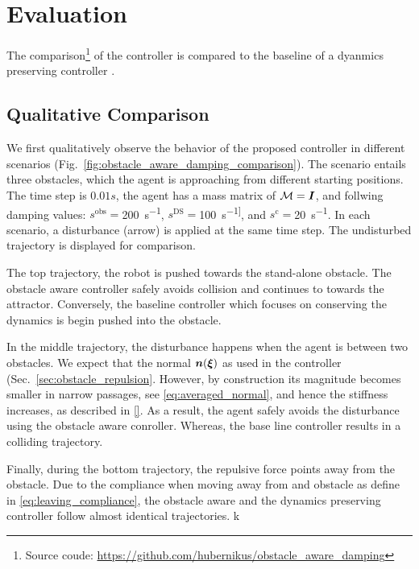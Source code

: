 \section{Evaluation}  \label{sec:evaluation} 

The comparison\footnote{Source coude: \url{https://github.com/hubernikus/obstacle_aware_damping}} of the controller is compared to the baseline of a dyanmics preserving controller \cite{kronander2015passive}.


\subsection{Qualitative Comparison} \label{sec:qual_comp}
We first qualitatively observe the behavior of the proposed controller in different scenarios (Fig.~\ref{fig:obstacle_aware_damping_comparison}). The scenario entails three obstacles, which the agent is approaching from different starting positions. The time step is $0.01 s$, the agent has a mass matrix of $\mathcal{M} = \boldsymbol{I}$, and follwing damping values: 
$s^{\mathrm{obs}}=$\qty{200}{s^{-1}},
$s^{\mathrm{DS}}=$\qty{100}{s^{-1]}}, and
$s^{\mathrm{c}}=$\qty{20}{s^{-1}}.
In each scenario, a disturbance (arrow) is applied at the same time step.
The undisturbed trajectory is displayed for comparison.

The top trajectory, the robot is pushed towards the stand-alone obstacle. The obstacle aware controller safely avoids collision and continues to towards the attractor. Conversely, the baseline controller which focuses on conserving the dynamics is begin pushed into the obstacle. 

In the middle trajectory, the disturbance happens when the agent is between two obstacles. We expect that the normal $\boldsymbol{n}(\boldsymbol{\xi})$ as used in the controller (Sec.~\ref{sec:obstacle_repulsion}.
However, by construction its magnitude becomes smaller in narrow passages, see \eqref{eq:averaged_normal}, and hence the stiffness increases, as described in \eqref{}.
As a result, the agent safely avoids the disturbance using the obstacle aware conroller. Whereas, the base line controller results in a colliding trajectory.

Finally, during the bottom trajectory, the repulsive force points away from the obstacle. Due to the compliance when moving away from and obstacle as define in \eqref{eq:leaving_compliance}, the obstacle aware and the dynamics preserving controller follow almost identical trajectories.
k

